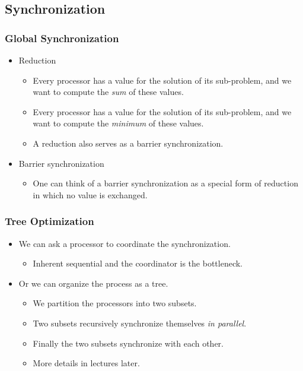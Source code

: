 \documentclass{beamer}
\begin{document}
\begin{CJK}{UTF8}{bsmi}
\subsection{Synchronization}

\begin{frame}
\frametitle{Global Synchronization}
\begin{itemize}
\item Reduction
\begin{itemize}
\item Every processor has a value for the solution of its sub-problem,
  and we want to compute the {\em sum} of these values.
\item Every processor has a value for the solution of its sub-problem,
  and we want to compute the {\em minimum} of these values.
\item A reduction also serves as a barrier synchronization.
\end{itemize}
\item Barrier synchronization
\begin{itemize}
\item One can think of a barrier synchronization as a special form of
  reduction in which no value is exchanged.
\end{itemize}
\end{itemize}
\end{frame}

\begin{frame}
\frametitle{Tree Optimization}
\begin{itemize}
\item We can ask a processor to coordinate the synchronization.
\begin{itemize}
\item Inherent sequential and the coordinator is the bottleneck.
\end{itemize}
\item Or we can organize the process as a tree. 
\begin{itemize}
\item We partition the processors into two subsets.
\item Two subsets recursively synchronize themselves {\em in
  parallel}.
\item Finally the two subsets synchronize with each other.
\item More details in lectures later.
\end{itemize}
\end{itemize}
\end{frame}


\end{CJK}
\end{document}
